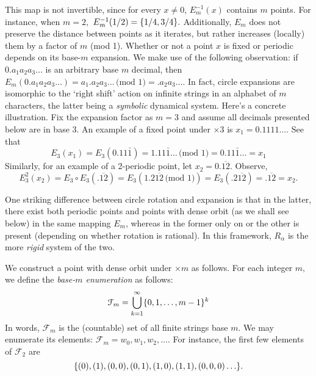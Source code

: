 \documentclass[12pt, letterpaper, oneside]{book}
\newcommand{\ga}{\ensuremath{\alpha}}
\DeclarePairedDelimiter{\set}{\lbrace}{\rbrace}
\theoremstyle{plain}
\theoremstyle{definition}
\theoremstyle{remark}
\begin{document}
This map is not invertible, since for every $x\neq 0$, $E_m^{-1}(x)$ contains $m$ points. For instance, when $m=2,$ $E_m^{-1}(1/2) = \set{1/4, 3/4}.$ Additionally, $E_m$ does not preserve the distance between points as it iterates, but rather increases (locally) them by a factor of $m$ (mod 1). Whether or not a point $x$ is fixed or periodic depends on its  base-$m$ expansion. We make use of the following observation: if $0.a_1a_2a_3\ldots$ is an arbitrary base $m$ decimal, then $E_m(0.a_1a_2a_3\ldots) = a_1.a_2a_3\ldots \, \mbox{(mod 1)} = .a_2a_3\ldots$. In fact, circle expansions are isomorphic to the `right shift' action on infinite strings in an alphabet of $m$ characters, the latter being a \textit{symbolic} dynamical system. Here's a concrete illustration. Fix the expansion factor as $m = 3$ and assume all decimals presented below are in base 3. An example of a fixed point under $\times3$ is $x_1 = 0.1111\ldots$. See that
\[
E_3(x_1) = E_3(0.11\bar1) = 1.11\bar1 \ldots \, \mbox{(mod 1)} = 0.11\bar1\ldots = x_1
\]
Similarly, for an example of a 2-periodic point, let $x_2 = 0.\overline{12}$. Observe,
\[
E_3^2(x_2) = E_3\circ E_3(.\overline{12}) = E_3(1.2\overline{12}\,\mbox{(mod 1)}) = E_3(.2\overline{12}) = .\overline{12} = x_2.
\]

One striking difference between circle rotation and expansion is that in the latter, there exist both periodic points and points with dense orbit (as we shall see below) in the same mapping $E_m$, whereas in the former only on or the other is present (depending on whether rotation is rational). In this framework, $R_\ga$ is the more \textit{rigid} system of the two. 

We construct a point with dense orbit under $\times m$ as follows. For each integer $m,$ we define the \textit{base-$m$ enumeration} as follows:
\[
\mathcal{F}_m = \bigcup_{k=1}^{\infty} \set{0,1,\ldots,m-1}^k
\]
In words, $\mathcal{F}_m$ is the (countable) set of all finite strings base $m.$ We may enumerate its elements: $\mathcal{F}_m = {w_0, w_1, w_2,\ldots}.$ For instance, the first few elements of $\mathcal{F}_2$ are
\[
\set{(0), (1), (0,0), (0,1), (1,0), (1,1), (0,0,0) \ldots}.
\]
\end{document}
